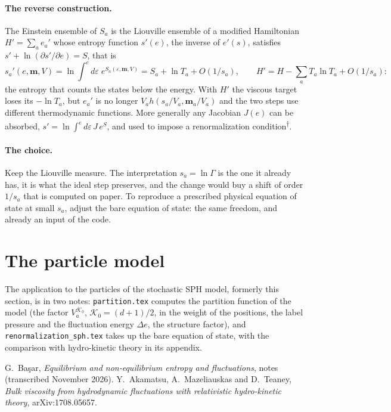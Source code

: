 \documentclass[11pt,aps,preprint,nofootinbib,superscriptaddress,tightenlines]{revtex4-2}
\def\st{\begin{equation}}
\def\stp{\end{equation}}
\let\oldparagraph\paragraph
\renewcommand{\paragraph}{\par\bigskip\oldparagraph}
\newcommand{\unv}{\textsuperscript{$\dagger$}}
\begin{document}
\paragraph{The reverse construction.}  The Einstein ensemble of $S_a$ is the Liouville ensemble of a modified Hamiltonian $H'=\sum_ae_a'$ whose
entropy function $s'(e)$, the inverse of $e'(s)$, satisfies $s'+\ln(\partial s'/\partial e)=S$, that is
\st
s_a'(e,\bm m,V)=\ln\int^ed\varepsilon\;e^{S_a(\varepsilon,\bm m,V)}=S_a+\ln T_a+O(1/s_a),\qquad H'=H-\sum_aT_a\ln T_a+O(1/s_a) :
\stp
the entropy that counts the states below the energy.  With $H'$ the viscous target loses its $-\ln T_a$, but $e_a'$ is no longer
$V_ah(s_a/V_a,\bm m_a/V_a)$ and the two steps use different thermodynamic functions.  More generally any Jacobian $J(e)$ can be absorbed,
$s'=\ln\int^ed\varepsilon\,J\,e^{S}$, and used to impose a renormalization condition\unv.

\paragraph{The choice.}  Keep the Liouville measure.  The interpretation $s_a=\ln\Gamma$ is the one it already has, it is what the ideal
step preserves, and the change would buy a shift of order $1/s_a$ that is computed on paper.  To reproduce a prescribed physical equation
of state at small $s_a$, adjust the bare equation of state: the same freedom, and already an input of the code.

\section{The particle model}
\label{sec:sph}

The application to the particles of the stochastic SPH model, formerly this section, is in two notes: \texttt{partition.tex} computes the partition
function of the model (the factor $V_a^{\mathcal K_0}$, $\mathcal K_0=(d+1)/2$, in the weight of the positions, the label pressure and the fluctuation energy
$\Delta e$, the structure factor), and \nolinkurl{renormalization_sph.tex} takes up the bare equation of state, with the comparison with hydro-kinetic theory
in its appendix.

\begin{thebibliography}{9}
 G.~Ba\c{s}ar, \emph{Equilibrium and non-equilibrium entropy and fluctuations}, notes (transcribed November 2026).
 Y.~Akamatsu, A.~Mazeliauskas and D.~Teaney, \emph{Bulk viscosity from hydrodynamic fluctuations with relativistic hydro-kinetic theory}, arXiv:1708.05657.
\end{thebibliography}
\end{document}
